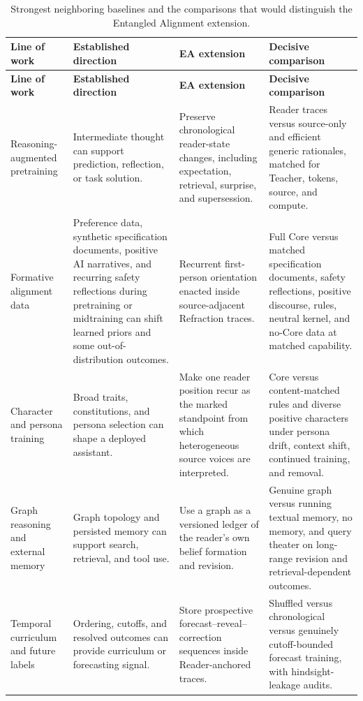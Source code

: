 \begingroup
\footnotesize
\setlength{\tabcolsep}{3pt}
\begin{longtable}{
  >{\raggedright\arraybackslash}p{2.8cm}
  >{\raggedright\arraybackslash}p{3.7cm}
  >{\raggedright\arraybackslash}p{4.0cm}
  >{\raggedright\arraybackslash}p{4.3cm}}
\caption{Strongest neighboring baselines and the comparisons that would
distinguish the Entangled Alignment extension.}
\label{tab:decisive-comparisons}\\
\toprule
\textbf{Line of work} & \textbf{Established direction} & \textbf{EA extension} & \textbf{Decisive comparison} \\
\midrule
\endfirsthead
\toprule
\textbf{Line of work} & \textbf{Established direction} & \textbf{EA extension} & \textbf{Decisive comparison} \\
\midrule
\endhead
\bottomrule
\endlastfoot
Reasoning-augmented pretraining & Intermediate thought can support prediction,
reflection, or task solution. & Preserve chronological reader-state changes,
including expectation, retrieval, surprise, and supersession. & Reader traces
versus source-only and efficient generic rationales, matched for Teacher,
tokens, source, and compute. \\
\addlinespace
Formative alignment data & Preference data, synthetic specification documents,
positive AI narratives, and recurring safety reflections during pretraining or
midtraining can shift learned priors and some out-of-distribution outcomes. & Recurrent first-person orientation
enacted inside source-adjacent Refraction traces. & Full Core versus matched
specification documents, safety reflections, positive discourse, rules,
neutral kernel, and no-Core data at matched capability. \\
\addlinespace
Character and persona training & Broad traits, constitutions, and persona
selection can shape a deployed assistant. & Make one reader position recur as
the marked standpoint from which heterogeneous source voices are interpreted.
& Core versus content-matched rules and diverse positive characters under
persona drift, context shift, continued training, and removal. \\
\addlinespace
Graph reasoning and external memory & Graph topology and persisted memory can
support search, retrieval, and tool use. & Use a graph as a versioned ledger of
the reader's own belief formation and revision. & Genuine graph versus running
textual memory, no memory, and query theater on long-range revision and
retrieval-dependent outcomes. \\
\addlinespace
Temporal curriculum and future labels & Ordering, cutoffs, and resolved
outcomes can provide curriculum or forecasting signal. & Store prospective
forecast--reveal--correction sequences inside Reader-anchored traces. &
Shuffled versus chronological versus genuinely cutoff-bounded forecast training,
with hindsight-leakage audits. \\
\end{longtable}
\endgroup

